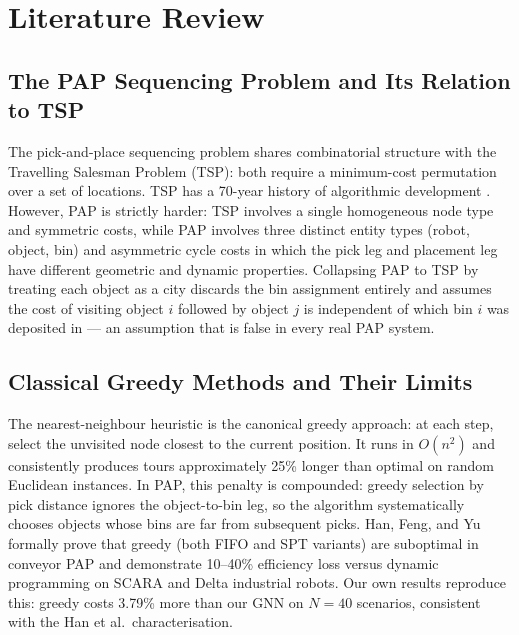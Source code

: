 \documentclass[conference]{IEEEtran}
\begin{document}
\section{Literature Review}\label{sec:lit}

\subsection{The PAP Sequencing Problem and Its Relation to TSP}

The pick-and-place sequencing problem shares combinatorial structure with the Travelling Salesman Problem (TSP): both require a minimum-cost permutation over a set of locations. TSP has a 70-year history of algorithmic development \cite{dantzig1954}. However, PAP is strictly harder: TSP involves a single homogeneous node type and symmetric costs, while PAP involves three distinct entity types (robot, object, bin) and asymmetric cycle costs in which the pick leg and placement leg have different geometric and dynamic properties. Collapsing PAP to TSP by treating each object as a city discards the bin assignment entirely and assumes the cost of visiting object $i$ followed by object $j$ is independent of which bin $i$ was deposited in --- an assumption that is false in every real PAP system.

\subsection{Classical Greedy Methods and Their Limits}

The nearest-neighbour heuristic \cite{rosenkrantz1977} is the canonical greedy approach: at each step, select the unvisited node closest to the current position. It runs in $O(n^2)$ and consistently produces tours approximately 25\% longer than optimal on random Euclidean instances. In PAP, this penalty is compounded: greedy selection by pick distance ignores the object-to-bin leg, so the algorithm systematically chooses objects whose bins are far from subsequent picks. Han, Feng, and Yu \cite{han2019pap} formally prove that greedy (both FIFO and SPT variants) are suboptimal in conveyor PAP and demonstrate 10--40\% efficiency loss versus dynamic programming on SCARA and Delta industrial robots. Our own results reproduce this: greedy costs 3.79\% more than our GNN on $N{=}40$ scenarios, consistent with the Han et al.\ characterisation.
\end{document}
